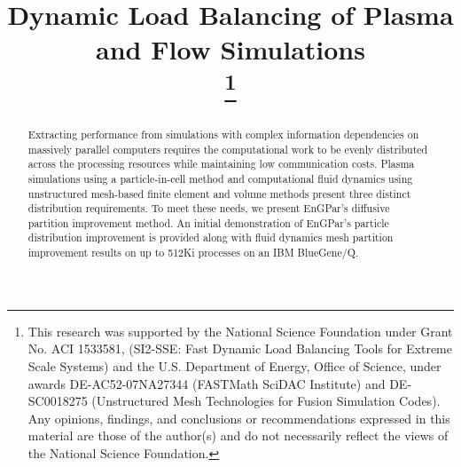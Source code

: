 \documentclass[conference]{IEEEtran}
\begin{document}
\title{Dynamic Load Balancing of Plasma and Flow Simulations\\
\thanks{
This research was supported by the National Science Foundation under Grant No.
ACI 1533581, (SI2-SSE: Fast Dynamic Load Balancing Tools for Extreme Scale
Systems) and the U.S. Department of Energy, Office of Science, under awards
DE-AC52-07NA27344 (FASTMath SciDAC Institute) and DE-SC0018275 (Unstructured
Mesh Technologies for Fusion Simulation Codes). Any opinions, findings, and
conclusions or recommendations expressed in this material are those of the
author(s) and do not necessarily reflect the views of the National Science
Foundation.
}}

\author{
\and
{}
\and
{}
\and
{}
}

\maketitle

\begin{abstract}
  Extracting performance from simulations with complex information dependencies
  on massively parallel computers requires the computational work to be evenly
  distributed across the processing resources while maintaining low
  communication costs.
  Plasma simulations using a particle-in-cell method and computational fluid
  dynamics using unstructured mesh-based finite element and volume
  methods present three distinct distribution requirements.
  To meet these needs, we present EnGPar's diffusive partition improvement
  method.
  An initial demonstration of EnGPar's particle distribution improvement is
  provided along with fluid dynamics mesh partition improvement results on up to
  512Ki processes on an IBM BlueGene/Q.
\end{abstract}
\end{document}
